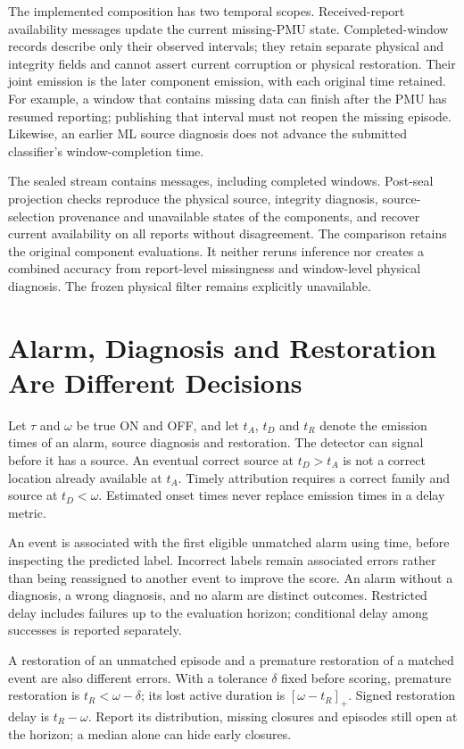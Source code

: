 The implemented composition has two temporal scopes. Received-report
availability messages update the current missing-PMU state. Completed-window
records describe only their observed intervals; they retain separate physical
and integrity fields and cannot assert current corruption or physical
restoration. Their joint emission is the later component emission, with each
original time retained. For example, a window that contains missing data can
finish after the PMU has resumed reporting; publishing that interval must not
reopen the missing episode. Likewise, an earlier ML source diagnosis does not
advance the submitted classifier's window-completion time.

The sealed stream contains \SystemMessages{} messages, including
\SystemWindows{} completed windows. Post-seal projection checks reproduce
the physical source, integrity diagnosis, source-selection provenance and
unavailable states of the components, and recover current availability on
all \SystemReports{} reports without disagreement. The comparison retains
the original component evaluations. It neither reruns inference nor creates
a combined accuracy from report-level missingness and window-level physical
diagnosis. The frozen physical filter remains explicitly unavailable.

\section{Alarm, Diagnosis and Restoration Are Different Decisions}
\label{app:decision-metrics}

Let $\tau$ and $\omega$ be true ON and OFF, and let
$t_A$, $t_D$ and $t_R$ denote the emission times of an alarm, source
diagnosis and restoration. The detector can signal before it has a source.
An eventual correct source at $t_D>t_A$ is not a correct location already
available at $t_A$. Timely attribution requires a correct family and source
at $t_D<\omega$. Estimated onset times never replace emission times in a
delay metric.\AIDraftingCredit{}

An event is associated with the first eligible unmatched alarm using time,
before inspecting the predicted label. Incorrect labels remain associated
errors rather than being reassigned to another event to improve the score.
An alarm without a diagnosis, a wrong diagnosis, and no alarm are distinct
outcomes. Restricted delay includes failures up to the evaluation horizon;
conditional delay among successes is reported separately.

A restoration of an unmatched episode and a premature restoration of a
matched event are also different errors. With a tolerance $\delta$ fixed
before scoring, premature restoration is $t_R<\omega-\delta$; its lost
active duration is $[\omega-t_R]_+$. Signed restoration delay is
$t_R-\omega$. Report its distribution, missing closures and episodes still
open at the horizon; a median alone can hide early closures.

